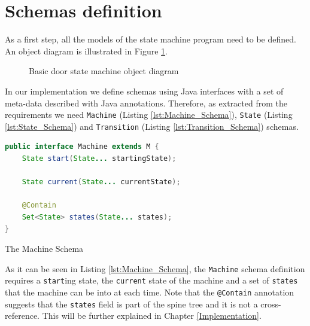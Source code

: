 \section{Schemas definition}
As a first step, all the models of the state machine program need to be defined. 
An object diagram is illustrated in Figure \ref{fig:State_machine_object}.

\begin{figure}[H]
	\centering
  	\caption{Basic door state machine object diagram}
  	\label{fig:State_machine_object}
\end{figure}

In our implementation we define schemas using Java interfaces with a set of meta-data described with Java annotations.
Therefore, as extracted from the requirements we need \texttt{Machine} (Listing \ref{lst:Machine_Schema}), \texttt{State} (Listing \ref{lst:State_Schema}) and \texttt{Transition} (Listing \ref{lst:Transition_Schema}) schemas.

\begin{sourcecode}[H]
	\begin{lstlisting}[language=Java,escapechar=|]
public interface Machine extends M {
	State start(State... startingState);

	State current(State... currentState);

	@Contain
	Set<State> states(State... states);
}
	\end{lstlisting}
	\caption{The Machine Schema}
	\label{lst:Machine_Schema}
\end{sourcecode}

As it can be seen in Listing \ref{lst:Machine_Schema}, the \texttt{Machine} schema definition requires a \texttt{start}ing state, the \texttt{current} state of the machine and a set of \texttt{states} that the machine can be into at each time.
Note that the \texttt{@Contain} annotation suggests that the \texttt{states} field is part of the spine tree and it is not a cross-reference.
This will be further explained in Chapter \ref{Implementation}.

